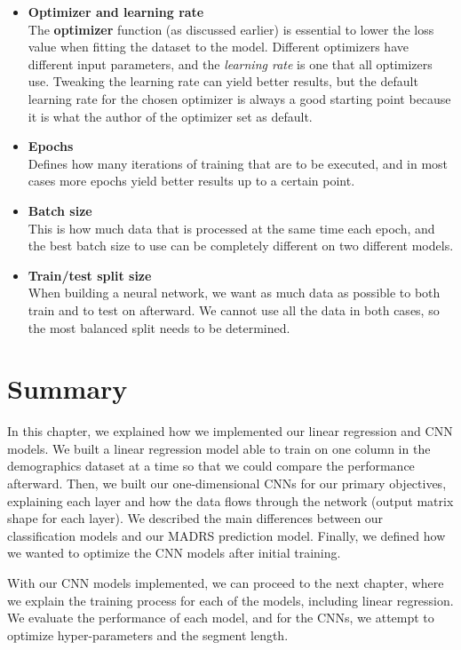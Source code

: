 \begin{itemize}
      \item \textbf{Optimizer and learning rate}\\
          The \textbf{optimizer} function (as discussed earlier) is essential to lower the loss value when fitting the dataset to the model. 
          Different optimizers have different input parameters, and the \textit{learning rate} is one that all optimizers use. 
          Tweaking the learning rate can yield better results, but the default learning rate for the chosen optimizer is always a good starting point because it is what the author of the optimizer set as default.
      \item \textbf{Epochs}\\
          Defines how many iterations of training that are to be executed, and in most cases more epochs yield better results up to a certain point.
      \item \textbf{Batch size}\\
          This is how much data that is processed at the same time each epoch, and the best batch size to use can be completely different on two different models. 
      \item \textbf{Train/test split size}\\
          When building a neural network, we want as much data as possible to both train and to test on afterward. We cannot use all the data in both cases, so the most balanced split needs to be determined.
\end{itemize}

\section{Summary}
In this chapter, we explained how we implemented our linear regression and CNN models. We built a linear regression model able to train on one column in the demographics dataset at a time so that we could compare the performance afterward. Then, we built our one-dimensional CNNs for our primary objectives, explaining each layer and how the data flows through the network (output matrix shape for each layer). We described the main differences between our classification models and our MADRS prediction model. Finally, we defined how we wanted to optimize the CNN models after initial training. 

With our CNN models implemented, we can proceed to the next chapter, where we explain the training process for each of the models, including linear regression. We evaluate the performance of each model, and for the CNNs, we attempt to optimize hyper-parameters and the segment length. 